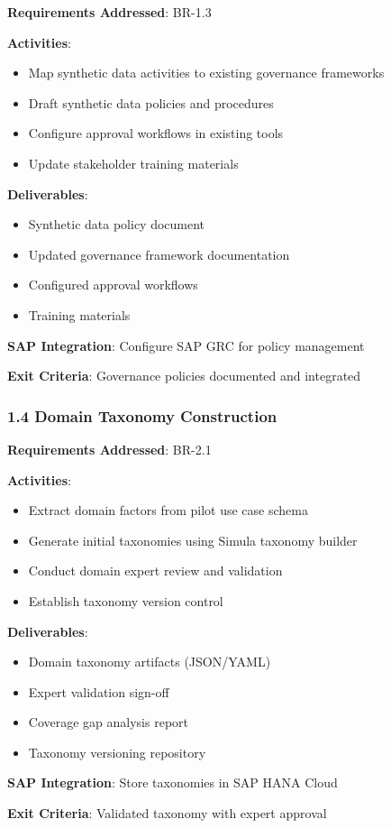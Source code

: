 \begin{tcolorbox}[colback=blue!5,colframe=blue!70,title=1.3 Governance Integration]
\textbf{Requirements Addressed}: BR-1.3

\textbf{Activities}:
\begin{itemize}
  \item Map synthetic data activities to existing governance frameworks
  \item Draft synthetic data policies and procedures
  \item Configure approval workflows in existing tools
  \item Update stakeholder training materials
\end{itemize}

\textbf{Deliverables}:
\begin{itemize}
  \item Synthetic data policy document
  \item Updated governance framework documentation
  \item Configured approval workflows
  \item Training materials
\end{itemize}

\textbf{SAP Integration}: Configure SAP GRC for policy management

\textbf{Exit Criteria}: Governance policies documented and integrated
\end{tcolorbox}

\subsubsection{1.4 Domain Taxonomy Construction}

\begin{tcolorbox}[colback=blue!5,colframe=blue!70,title=1.4 Taxonomy Development]
\textbf{Requirements Addressed}: BR-2.1

\textbf{Activities}:
\begin{itemize}
  \item Extract domain factors from pilot use case schema
  \item Generate initial taxonomies using Simula taxonomy builder
  \item Conduct domain expert review and validation
  \item Establish taxonomy version control
\end{itemize}

\textbf{Deliverables}:
\begin{itemize}
  \item Domain taxonomy artifacts (JSON/YAML)
  \item Expert validation sign-off
  \item Coverage gap analysis report
  \item Taxonomy versioning repository
\end{itemize}

\textbf{SAP Integration}: Store taxonomies in SAP HANA Cloud

\textbf{Exit Criteria}: Validated taxonomy with expert approval
\end{tcolorbox}

